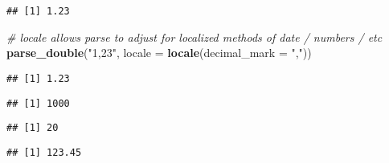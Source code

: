 \documentclass[]{article}
\newenvironment{Shaded}{\begin{snugshade}}{\end{snugshade}}
\newcommand{\KeywordTok}[1]{\textcolor[rgb]{0.13,0.29,0.53}{\textbf{#1}}}
\newcommand{\DataTypeTok}[1]{\textcolor[rgb]{0.13,0.29,0.53}{#1}}
\newcommand{\StringTok}[1]{\textcolor[rgb]{0.31,0.60,0.02}{#1}}
\newcommand{\CommentTok}[1]{\textcolor[rgb]{0.56,0.35,0.01}{\textit{#1}}}
\newcommand{\NormalTok}[1]{#1}
\begin{document}
\begin{verbatim}
## [1] 1.23
\end{verbatim}

\begin{Shaded}
\begin{Highlighting}[]
\CommentTok{# locale allows parse to adjust for localized methods of date / numbers / etc}
\KeywordTok{parse_double}\NormalTok{(}\StringTok{"1,23"}\NormalTok{, }\DataTypeTok{locale =} \KeywordTok{locale}\NormalTok{(}\DataTypeTok{decimal_mark =} \StringTok{","}\NormalTok{))}
\end{Highlighting}
\end{Shaded}

\begin{verbatim}
## [1] 1.23
\end{verbatim}

\begin{Shaded}
\end{Shaded}

\begin{verbatim}
## [1] 1000
\end{verbatim}

\begin{Shaded}
\end{Shaded}

\begin{verbatim}
## [1] 20
\end{verbatim}

\begin{Shaded}
\end{Shaded}

\begin{verbatim}
## [1] 123.45
\end{verbatim}

\begin{Shaded}
\end{Shaded}
\end{document}
